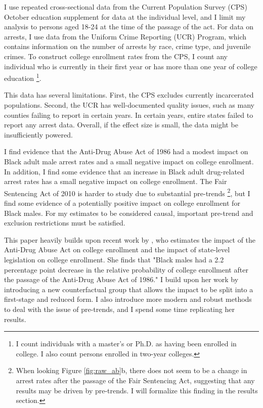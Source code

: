 \documentclass{article}
\begin{document}

I use repeated cross-sectional data from the Current Population Survey (CPS) October education supplement for data at the individual level, and I limit my analysis to persons aged 18-24 at the time of the passage of the act. For data on arrests, I use data from the Uniform Crime Reporting (UCR) Program, which contains information on the number of arrests by race, crime type, and juvenile crimes. To construct college enrollment rates from the CPS, I count any individual who is currently in their first year or has more than one year of college education \footnote{I count individuals with a master's or Ph.D. as having been enrolled in college. I also count persons enrolled in two-year colleges.}.

This data has several limitations. First, the CPS excludes currently incarcerated populations. Second, the UCR has well-documented quality issues, such as many counties failing to report in certain years. In certain years, entire states failed to report any arrest data. Overall, if the effect size is small, the data might be insufficiently powered.


I find evidence that the Anti-Drug Abuse Act of 1986 had a modest impact on Black adult male arrest rates and a small negative impact on college enrollment. In addition, I find some evidence that an increase in Black adult drug-related arrest rates has a small negative impact on college enrollment. The Fair Sentencing Act of 2010 is harder to study due to substantial pre-trends \footnote{When looking Figure \ref{fig:raw_ab}b, there does not seem to be a change in arrest rates after the passage of the Fair Sentencing Act, suggesting that any results may be driven by pre-trends. I will formalize this finding in the results section.}, but I find some evidence of a potentially positive impact on college enrollment for Black males. For my estimates to be considered causal, important pre-trend and exclusion restrictions must be satisfied.

This paper heavily builds upon recent work by \cite{britton2022}, who estimates the impact of the Anti-Drug Abuse Act on college enrollment and the impact of state-level legislation on college enrollment. She finds that "Black males had a 2.2 percentage point decrease in the relative probability of college enrollment after the passage of the Anti-Drug Abuse Act of 1986." I build upon her work by introducing a new counterfactual group that allows the impact to be split into a first-stage and reduced form. I also introduce more modern and robust methods to deal with the issue of pre-trends, and I spend some time replicating her results.
\end{document}
